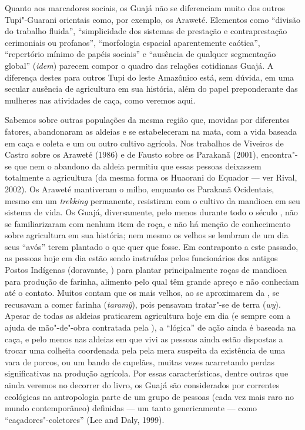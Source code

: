 Quanto aos marcadores sociais, os Guajá não se diferenciam muito dos
outros Tupi"-Guarani orientais como, por exemplo, os Araweté. Elementos
como ``divisão do trabalho fluida'', ``simplicidade dos sistemas de
prestação e contraprestação cerimoniais ou profanos'', ``morfologia
espacial aparentemente caótica'', ``repertório mínimo de papéis
sociais'' e ``ausência de qualquer segmentação global'' (\emph{idem}) parecem
compor o quadro das relações cotidianas Guajá. A diferença destes para
outros Tupi do leste Amazônico está, sem dúvida, em uma secular ausência
de agricultura em sua história, além do papel preponderante das mulheres
nas atividades de caça, como veremos aqui.

Sabemos sobre outras populações da mesma região que, movidas por
diferentes fatores, abandonaram as aldeias e se estabeleceram na mata,
com a vida baseada em caça e coleta e um ou outro cultivo agrícola. Nos
trabalhos de Viveiros de Castro sobre os Araweté (1986) e de Fausto
sobre os Parakanã (2001), encontra"-se que nem o abandono da aldeia
permitiu que essas pessoas deixassem totalmente a agricultura (da mesma
forma os Huaorani do Equador --- ver Rival, 2002). Os Araweté mantiveram o
milho, enquanto os Parakanã Ocidentais, mesmo em um \emph{trekking}
permanente, resistiram com o cultivo da mandioca em seu sistema de vida.
Os Guajá, diversamente, pelo menos durante todo o século , não se
familiarizaram com nenhum item de roça, e não há menção de conhecimento
sobre agricultura em sua história; nem mesmo os velhos se lembram de um
dia seus ``avós'' terem plantado o que quer que fosse. Em contraponto a
este passado, as pessoas hoje em dia estão sendo instruídas pelos
funcionários dos antigos Postos Indígenas (doravante, ) para plantar
principalmente roças de mandioca para produção de farinha, alimento pelo
qual têm grande apreço e não conheciam até o contato. Muitos contam que
os mais velhos, ao se aproximarem da , se recusavam a comer farinha
(\emph{taramỹ}), pois pensavam tratar"-se de terra (\emph{wy}). Apesar de
todas as aldeias praticarem agricultura hoje em dia (e sempre com a
ajuda de mão"-de"-obra contratada pela ), a ``lógica'' de ação ainda é
baseada na caça, e pelo menos nas aldeias em que vivi as pessoas ainda
estão dispostas a trocar uma colheita coordenada pela  pela mera
suspeita da existência de uma vara de porcos, ou um bando de capelães,
muitas vezes acarretando perdas significativas na produção agrícola. Por
essas características, dentre outras que ainda veremos no decorrer do
livro, os Guajá são considerados por correntes ecológicas na
antropologia parte de um grupo de pessoas (cada vez mais raro no mundo
contemporâneo) definidas --- um tanto genericamente --- como
``caçadores"-coletores'' (Lee and Daly, 1999).

